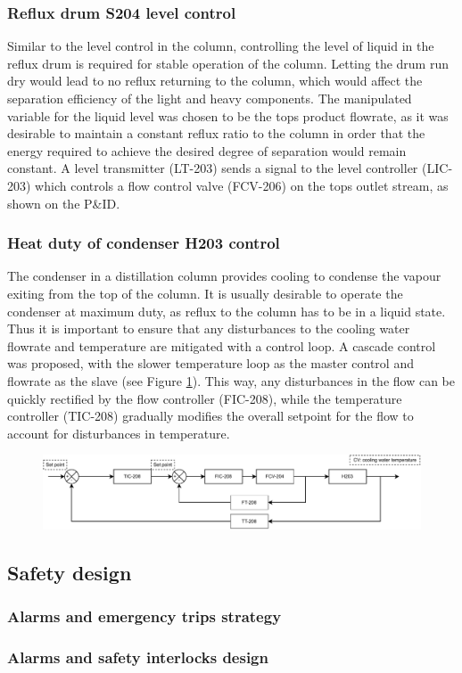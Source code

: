 \subsubsection{Reflux drum S204 level control}%
Similar to the level control in the column, controlling the level of liquid in the reflux drum is required for stable operation of the column. Letting the drum run dry would lead to no reflux returning to the column, which would affect the separation efficiency of the light and heavy components. The manipulated variable for the liquid level was chosen to be the tops product flowrate, as it was desirable to maintain a constant reflux ratio to the column in order that the energy required to achieve the desired degree of separation would remain constant. A level transmitter (LT-203) sends a signal to the level controller (LIC-203) which controls a flow control valve (FCV-206) on the tops outlet stream, as shown on the P\&ID. 


\subsubsection{Heat duty of condenser H203 control}%
The condenser in a distillation column provides cooling to condense the vapour exiting from the top of the column. It is usually desirable to operate the condenser at maximum duty, as reflux to the column has to be in a liquid state. Thus it is important to ensure that any disturbances to the cooling water flowrate and temperature are mitigated with a control loop. A cascade control was proposed, with the slower temperature loop as the master control and flowrate as the slave (see Figure \ref{fig:S203C-TC}). This way, any disturbances in the flow can be quickly rectified by the flow controller (FIC-208), while the temperature controller (TIC-208) gradually modifies the overall setpoint for the flow to account for disturbances in temperature.

\begin{figure}[h]
    \centering
    \includegraphics[width=0.8\linewidth]{chapters/4-operation-control/4-Figures/H203-TC.pdf}
    \caption{}
    \label{fig:S203C-TC}
\end{figure}



\subsection{Safety design}

\subsubsection{Alarms and emergency trips strategy}

\subsubsection{Alarms and safety interlocks design}